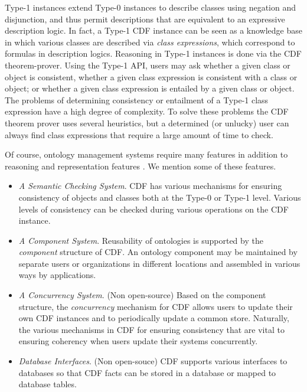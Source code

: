 Type-1 instances extend Type-0 instances to describe classes using
negation and disjunction, and thus permit descriptions that are
equivalent to an expressive description logic.  In fact, a Type-1 CDF
instance can be seen as a knowledge base in which various classes are
described via {\em class expressions}, which correspond to formulas in
description logics.  Reasoning in Type-1 instances is done via the CDF
theorem-prover.  Using the Type-1 API, users may ask whether a given
class or object is consistent, whether a given class expression is
consistent with a class or object; or whether a given class expression
is entailed by a given class or object.  The problems of determining
consistency or entailment of a Type-1 class expression have a high
degree of complexity.  To solve these problems the CDF theorem prover
uses several heuristics, but a determined (or unlucky) user can always
find class expressions that require a large amount of time to check.

Of course, ontology management systems require many features in
addition to reasoning and representation features \cite{MGPS03}.  We
mention some of these features.

\begin{itemize}
\item {\em A Semantic Checking System}.  CDF has various mechanisms for
ensuring consistency of objects and classes both at the Type-0 or
Type-1 level.  Various levels of consistency can be checked during
various operations on the CDF instance.
%
\item {\em A Component System}. Reusability of ontologies is supported
by the {\em component} structure of CDF.  An ontology component may be
maintained by separate users or organizations in different locations
and assembled in various ways by applications.
%
\item {\em A Concurrency System}. (Non open-source) Based on the
component structure, the {\em concurrency} mechanism for CDF allows
users to update their own CDF instances and to periodically update a
common store. Naturally, the various mechanisms in CDF for ensuring
consistency that are vital to ensuring coherency when users update
their systems concurrently.
%
\item {\em Database Interfaces}. (Non open-souce) CDF supports various
interfaces to databases so that CDF facts can be stored in a database
or mapped to database tables.
\end{itemize}

